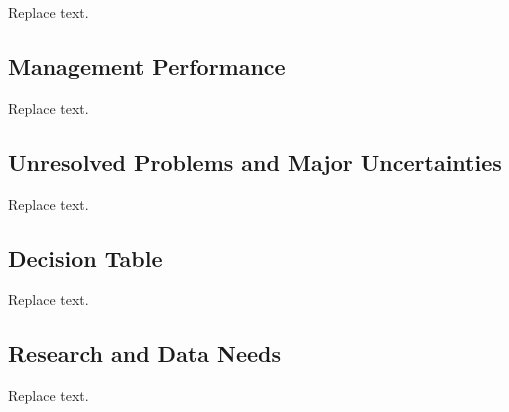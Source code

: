 \documentclass[11pt,
  english,
  a4paper,
]{article}
\begin{document}
Replace text.


\hypertarget{management-performance}{%
\subsection*{Management Performance}\label{management-performance}}

\leavevmode\tagmcend\tagstructend

Replace text.


\hypertarget{unresolved-problems-and-major-uncertainties}{%
\subsection*{Unresolved Problems and Major Uncertainties}\label{unresolved-problems-and-major-uncertainties}}

\leavevmode\tagmcend\tagstructend

Replace text.


\hypertarget{decision-table}{%
\subsection*{Decision Table}\label{decision-table}}

\leavevmode\tagmcend\tagstructend

Replace text.


\hypertarget{research-and-data-needs}{%
\subsection*{Research and Data Needs}\label{research-and-data-needs}}

\leavevmode\tagmcend\tagstructend

Replace text.

\pagebreak
\setlength{\parskip}{5mm plus1mm minus1mm}
\setcounter{page}{1}
\renewcommand{\thefigure}{\arabic{figure}}
\renewcommand{\thetable}{\arabic{table}}
\setcounter{table}{0}
\setcounter{figure}{0}
\end{document}
